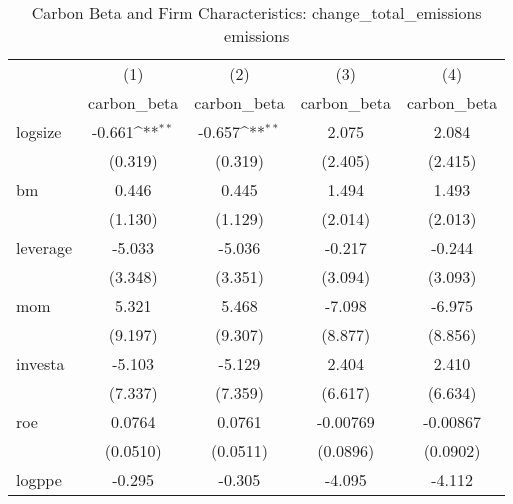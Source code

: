 \begin{table}[htbp]\centering
\def\sym#1{\ifmmode^{#1}\else\(^{#1}\)\fi}
\caption{Carbon Beta and Firm Characteristics: change\_total\_emissions emissions}
\begin{tabular}{l*{4}{c}}
\hline\hline
                    &\multicolumn{1}{c}{(1)}&\multicolumn{1}{c}{(2)}&\multicolumn{1}{c}{(3)}&\multicolumn{1}{c}{(4)}\\
                    &\multicolumn{1}{c}{carbon\_beta}&\multicolumn{1}{c}{carbon\_beta}&\multicolumn{1}{c}{carbon\_beta}&\multicolumn{1}{c}{carbon\_beta}\\
\hline
logsize             &      -0.661\sym{**} &      -0.657\sym{**} &       2.075         &       2.084         \\
                    &     (0.319)         &     (0.319)         &     (2.405)         &     (2.415)         \\
[1em]
bm                  &       0.446         &       0.445         &       1.494         &       1.493         \\
                    &     (1.130)         &     (1.129)         &     (2.014)         &     (2.013)         \\
[1em]
leverage            &      -5.033         &      -5.036         &      -0.217         &      -0.244         \\
                    &     (3.348)         &     (3.351)         &     (3.094)         &     (3.093)         \\
[1em]
mom                 &       5.321         &       5.468         &      -7.098         &      -6.975         \\
                    &     (9.197)         &     (9.307)         &     (8.877)         &     (8.856)         \\
[1em]
investa             &      -5.103         &      -5.129         &       2.404         &       2.410         \\
                    &     (7.337)         &     (7.359)         &     (6.617)         &     (6.634)         \\
[1em]
roe                 &      0.0764         &      0.0761         &    -0.00769         &    -0.00867         \\
                    &    (0.0510)         &    (0.0511)         &    (0.0896)         &    (0.0902)         \\
[1em]
logppe              &      -0.295         &      -0.305         &      -4.095         &      -4.112         \\

\end{tabular}
\end{table}
